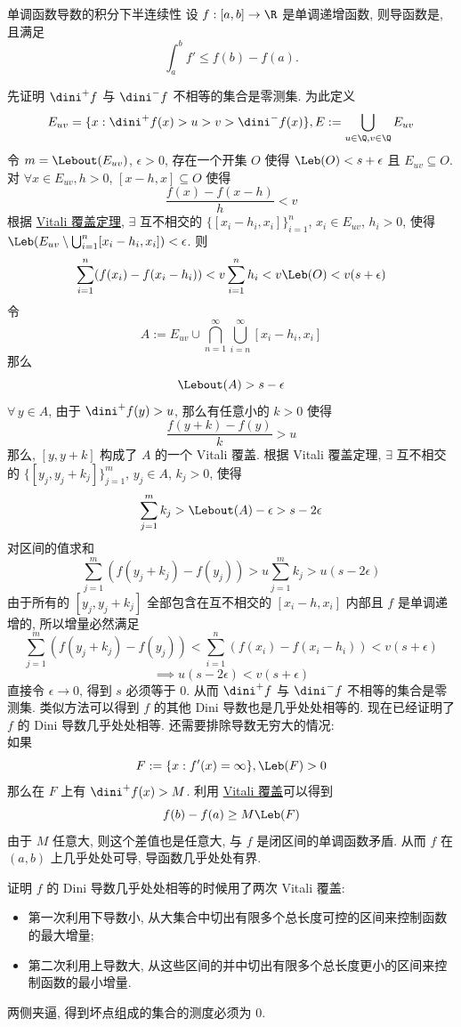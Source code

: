 \begin{thm}
    {单调函数导数的积分下半连续性}
    设 \(f:[a,b]\to\R\) 是单调递增函数, 则导函数是\MeasurableFunc{}, 且满足
    \[\int_a^b f'\leq f(b)-f(a).\]
\end{thm}
\begin{prf}
    先证明 \(\dini^+ f\) 与 \(\dini^- f\) 不相等的集合是零测集. 为此定义
    \[E_{uv}=\{x: \dini^+ f(x)> u> v> \dini^- f(x)\}, E:=\bigcup_{u\in\Q, v\in\Q} E_{uv}\]
    令 \(m=\Lebout(E_{uv})\), \(\epsilon>0\), 存在一个开集 \(O\) 使得 \(\Leb(O)<s+\epsilon\) 且 \(E_{uv}\subseteq O\).\\
    对 \(\forall x\in E_{uv},h>0\), \([x-h, x]\subseteq O\) 使得
    \[\frac{f(x)-f(x-h)}{h}<v\]
    根据 \hyperref[thm:vitali-covering]{Vitali 覆盖定理}, \(\exists\) 互不相交的 \(\{[x_i-h_i, x_i]\}_{i=1}^n\), \(x_i\in E_{uv}\), \(h_i>0\), 使得 \(\Leb(E_{uv}\setminus\bigcup_{i=1}^n [x_i-h_i, x_i])<\epsilon\). 则
    \[\sum_{i=1}^n(f(x_i)-f(x_i-h_i))<v\sum_{i=1}^n h_i<v\Leb(O)< v(s+\epsilon) \]
    令 
    \[A:=E_{uv}\cup \bigcap_{n=1}^\infty \bigcup_{i=n}^\infty [x_i-h_i, x_i]\]
    那么
    \[\Lebout(A)>s-\epsilon\]
    \(\forall\,y\in A\), 由于 \(\dini^+ f(y)>u\), 那么有任意小的 \(k>0\) 使得
    \[\frac{f(y+k)-f(y)}{k}>u\]
    那么, \([y,y+k]\) 构成了 \(A\) 的一个 Vitali 覆盖. 根据 Vitali 覆盖定理, \(\exists\) 互不相交的 \(\{[y_j,y_j+k_j]\}_{j=1}^m\), \(y_j\in A\), \(k_j>0\), 使得 
    \[\sum_{j=1}^m k_j>\Lebout(A)-\epsilon>s-2\epsilon\]
    对区间的值求和
    \[\sum_{j=1}^m (f(y_j+k_j)-f(y_j))>u\sum_{j=1}^m k_j>u(s-2\epsilon)\]
    由于所有的 \([y_j,y_j+k_j]\) 全部包含在互不相交的 \([x_i-h, x_i]\) 内部且 \(f\) 是单调递增的, 所以增量必然满足
    \[\sum_{j=1}^m (f(y_j+k_j)-f(y_j))<\sum_{i=1}^n(f(x_i)-f(x_i-h_i))<v(s+\epsilon)\]
    \[\implies u(s-2\epsilon)<v(s+\epsilon)\]
    直接令 \(\epsilon\to 0\), 得到 \(s\) 必须等于 0. 从而 \(\dini^+ f\) 与 \(\dini^- f\) 不相等的集合是零测集. 类似方法可以得到 \(f\) 的其他 Dini 导数也是几乎处处相等的.
    现在已经证明了 \(f\) 的 Dini 导数几乎处处相等. 还需要排除导数无穷大的情况:\\
    如果
    \[F:=\{x: f'(x) = \infty\}, \Leb(F)>0\]
    那么在 \(F\) 上有 \(\dini^+ f(x)>M\). 利用 \hyperref[thm:vitali-covering]{Vitali 覆盖}可以得到
    \[f(b)-f(a)\geq M\Leb(F)\]
    由于 \(M\) 任意大, 则这个差值也是任意大, 与 \(f\) 是闭区间的单调函数矛盾. 从而 \(f\) 在 \((a,b)\) 上几乎处处可导, 导函数几乎处处有界.
\end{prf}
\begin{rmk}
    证明 \(f\) 的 Dini 导数几乎处处相等的时候用了两次 Vitali 覆盖:
    \begin{itemize}
        \item 第一次利用下导数小, 从大集合中切出有限多个总长度可控的区间来控制函数的最大增量;
        \item 第二次利用上导数大, 从这些区间的并中切出有限多个总长度更小的区间来控制函数的最小增量.
    \end{itemize}
    两侧夹逼, 得到坏点组成的集合的测度必须为 0.
\end{rmk}
